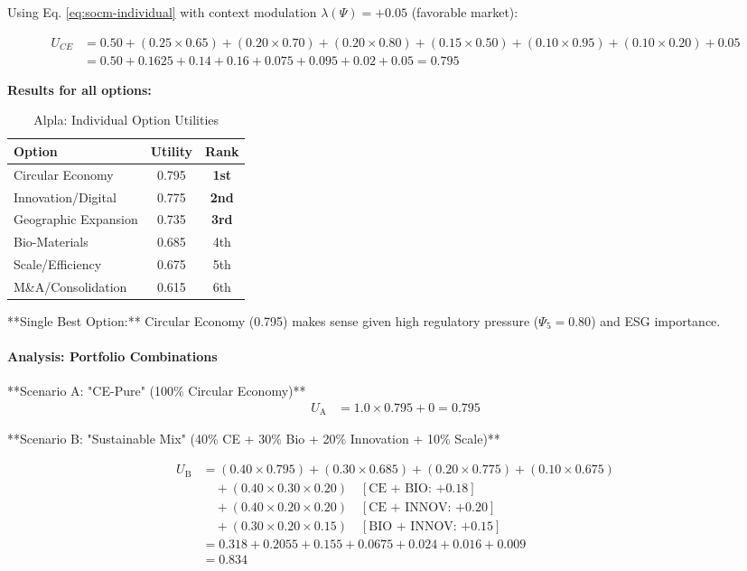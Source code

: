 Using Eq. \ref{eq:socm-individual} with context modulation $\lambda(\Psi) = +0.05$ (favorable market):

\begin{align}
U_{CE} &= 0.50 + (0.25 \times 0.65) + (0.20 \times 0.70) + (0.20 \times 0.80) + (0.15 \times 0.50) + (0.10 \times 0.95) + (0.10 \times 0.20) + 0.05 \\
&= 0.50 + 0.1625 + 0.14 + 0.16 + 0.075 + 0.095 + 0.02 + 0.05 = 0.795
\end{align}

\textbf{Results for all options:}

\begin{table}[htbp]
\centering
\caption{Alpla: Individual Option Utilities}
\label{tab:alpla-utilities}
\renewcommand{\arraystretch}{1.3}
\begin{tabular}{@{}lcc@{}}
\toprule
\textbf{Option} & \textbf{Utility} & \textbf{Rank} \\
\midrule
Circular Economy & 0.795 & \textbf{1st} \\
Innovation/Digital & 0.775 & \textbf{2nd} \\
Geographic Expansion & 0.735 & \textbf{3rd} \\
Bio-Materials & 0.685 & 4th \\
Scale/Efficiency & 0.675 & 5th \\
M\&A/Consolidation & 0.615 & 6th \\
\bottomrule
\end{tabular}
\end{table}

**Single Best Option:** Circular Economy (0.795) makes sense given high regulatory pressure ($\Psi_5 = 0.80$) and ESG importance.

\paragraph{Analysis: Portfolio Combinations}

**Scenario A: "CE-Pure" (100\% Circular Economy)**
\begin{align}
U_{\text{A}} &= 1.0 \times 0.795 + 0 = 0.795
\end{align}

**Scenario B: "Sustainable Mix" (40\% CE + 30\% Bio + 20\% Innovation + 10\% Scale)**

\begin{align}
U_{\text{B}} &= (0.40 \times 0.795) + (0.30 \times 0.685) + (0.20 \times 0.775) + (0.10 \times 0.675) \\
&\quad + (0.40 \times 0.30 \times 0.20) \quad [\text{CE + BIO: +0.18}] \\
&\quad + (0.40 \times 0.20 \times 0.20) \quad [\text{CE + INNOV: +0.20}] \\
&\quad + (0.30 \times 0.20 \times 0.15) \quad [\text{BIO + INNOV: +0.15}] \\
&= 0.318 + 0.2055 + 0.155 + 0.0675 + 0.024 + 0.016 + 0.009 \\
&= 0.834
\end{align}

